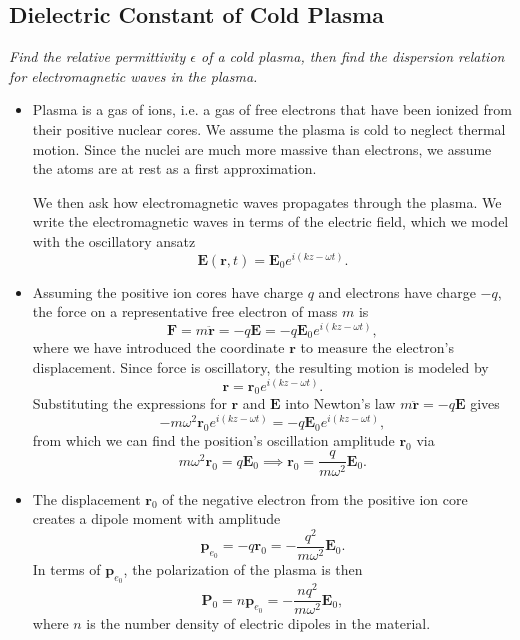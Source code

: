 \documentclass[11pt, a4paper]{article}
\renewcommand{\vec}[1]{\bm{#1}} %
\renewcommand{\r}{\vec{r}}
\newcommand{\E}{\vec{E}}  %
\newcommand{\e}{\epsilon}
\renewcommand{\P}{\vec{P}}  %
\begin{document}
\subsection{Dielectric Constant of Cold Plasma} \label{ss:cold-plasma}
\textit{Find the relative permittivity $ \e $ of a cold plasma, then find the dispersion relation for electromagnetic waves in the plasma.}
\begin{itemize}
	\item Plasma is a gas of ions, i.e. a gas of free electrons that have been ionized from their positive nuclear cores. We assume the plasma is cold to neglect thermal motion. Since the nuclei are much more massive than electrons, we assume the atoms are at rest as a first approximation. 
	
	We then ask how electromagnetic waves propagates through the plasma. We write the electromagnetic waves in terms of the electric field, which we model with the oscillatory ansatz
	\begin{equation*}
        \E(\r, t) = \E_{0} e^{i(kz - \omega t)}.
	\end{equation*}
	
	\item Assuming the positive ion cores have charge $ q $ and electrons have charge $ -q $, the force on a representative free electron of mass $ m $ is
	\begin{equation*}
		\vec{F}  = m \ddot{\r} = - q \E = - q \E_{0} e^{i(kz - \omega t)},
	\end{equation*}
	where we have introduced the coordinate $ \r $ to measure the electron's displacement. Since force is oscillatory, the resulting motion is modeled by
	\begin{equation*}
		\r = \r_{0}e^{i(kz - \omega t)}.
	\end{equation*}
	Substituting the expressions for $ \r $ and $ \E $ into Newton's law $ m \ddot{\r} = - q \E  $ gives
	\begin{equation*}
		- m \omega^{2}\r_{0}e^{i(kz - \omega t)} =  - q \E_{0} e^{i(kz - \omega t)},
	\end{equation*}
	from which we can find the position's oscillation amplitude $ \r_{0} $ via
	\begin{equation*}
		m \omega^{2} \r_{0} = q \E_{0} \implies \r_{0} = \frac{q}{m \omega^{2}}\E_{0}.
	\end{equation*}
	
	\item The displacement $ \r_{0} $ of the negative electron from the positive ion core creates a dipole moment with amplitude
	\begin{equation*}
        \vec{p}_{e_{0}} = - q \r_{0} = - \frac{q^{2}}{m \omega^{2}} \E_{0}.
	\end{equation*}
	In terms of $ \vec{p}_{e_{0}} $, the polarization of the plasma is then
	\begin{equation*}
		\P_{0} = n \vec{p}_{e_{0}} =  - \frac{nq^{2}}{m \omega^{2}} \E_{0},
	\end{equation*}
	where $ n $ is the number density of electric dipoles in the material. 
	

\end{itemize}
\end{document}
